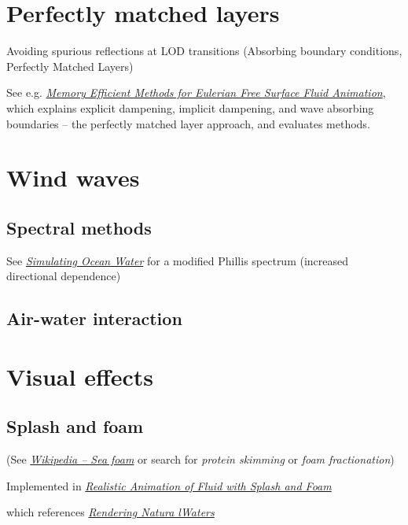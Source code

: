 \section{Perfectly matched layers}

Avoiding spurious reflections at LOD transitions (Absorbing boundary conditions, Perfectly Matched Layers)

See e.g. \textit{\href{http://liu.diva-portal.org/smash/get/diva2:359805/FULLTEXT01}{Memory Efficient Methods for Eulerian Free Surface Fluid Animation}}, which explains explicit dampening, implicit dampening, and wave absorbing boundaries -- the perfectly matched layer approach, and evaluates methods.

\section{Wind waves}

\subsection{Spectral methods}

See \textit{\href{http://graphics.ucsd.edu/courses/rendering/2005/jdewall/tessendorf.pdf}{Simulating Ocean Water}} for a modified Phillis spectrum (increased directional dependence)

\subsection{Air-water interaction}

\section{Visual effects}

\subsection{Splash and foam}

(See \textit{\href{http://en.wikipedia.org/wiki/Sea_foam}{Wikipedia -- Sea foam}} or search for \textit{protein skimming} or \textit{foam fractionation})

Implemented in \textit{\href{http://nguyendangbinh.org/Proceedings/Eurographics/2003/cgf/volume22/issue3/paper127/paper127.pdf}{Realistic Animation of Fluid with Splash and Foam}}

which references \textit{\href{http://citeseerx.ist.psu.edu/viewdoc/download?doi=10.1.1.4.6262&rep=rep1&type=pdf}{Rendering Natura lWaters}}

